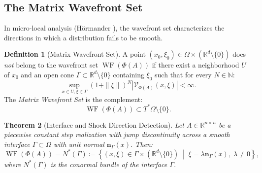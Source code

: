 \documentclass[11pt,a4paper,reqno]{amsart}
\newtheorem{theorem}{Theorem}[section]
\theoremstyle{definition}
\newtheorem{definition}[theorem]{Definition}
\numberwithin{equation}{section}
\newcommand{\R}{\mathbb{R}}
\newcommand{\WF}{\operatorname{WF}}
\begin{document}
\subsection{The Matrix Wavefront Set}
In micro-local analysis (Hörmander \cite{hormander2003analysis}), the wavefront set characterizes the directions in which a distribution fails to be smooth.

\begin{definition}[Matrix Wavefront Set]
A point $(x_0, \xi_0) \in \Omega \times (\R^d \setminus \{0\})$ does \emph{not} belong to the wavefront set $\WF(\Phi(A))$ if there exist a neighborhood $U$ of $x_0$ and an open cone $\Gamma \subset \R^d \setminus \{0\}$ containing $\xi_0$ such that for every $N \in \mathbb{N}$:
\begin{equation}
    \sup_{x \in U, \xi \in \Gamma} (1 + \|\xi\|)^N \left| \mathcal{V}_{\Phi(A)}(x, \xi) \right| < \infty.
\end{equation}
The \emph{Matrix Wavefront Set} is the complement:
\begin{equation}
    \WF(\Phi(A)) \subset T^*\Omega \setminus \{0\}.
\end{equation}
\end{definition}

\begin{theorem}[Interface and Shock Direction Detection]
\label{thm:wavefront_interface}
Let $A \in \R^{n \times n}$ be a piecewise constant step realization with jump discontinuity across a smooth interface $\Gamma \subset \Omega$ with unit normal $\mathbf{n}_\Gamma(x)$. Then:
\begin{equation}
    \WF(\Phi(A)) = N^*(\Gamma) \coloneqq \left\{ (x, \xi) \in \Gamma \times (\R^d \setminus \{0\}) \;\middle|\; \xi = \lambda \mathbf{n}_\Gamma(x), \; \lambda \ne 0 \right\},
\end{equation}
where $N^*(\Gamma)$ is the conormal bundle of the interface $\Gamma$.
\end{theorem}
\end{document}
